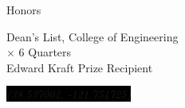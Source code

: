 \documentclass[letterpaper]{article}
\newcommand{\sectiontitle}[1]{
	{\color{magenta} \vline height 1em depth 1pt width 1.5pt}%
	{\large \colorbox{offwhite}{\color{black} \textsc{#1}}}
	\vspace*{0.5em}
}
\newcommand{\sectionseparator}[1]{
	\hline
	\vspace*{1em}
}
\begin{document}
\begin{minipage}[t]{0.35\textwidth}
		\sectionseparator

		\sectiontitle{Honors}

		\begin{small}
		{Dean's List, College of Engineering} \\
		\hspace*{2em} $\times$ {6 Quarters} \\
		{Edward Kraft Prize Recipient} \\	
		\end{small}

		\vspace*{4em}
			
		\begin{center}
			\begin{scriptsize}
				\colorbox{black}{\color{white} \textit{(38.537002, -121.754725)}}
			\end{scriptsize}
		\end{center}			
			
	\end{minipage}				
\end{document}
